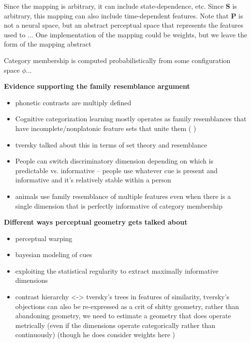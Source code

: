 \begin{multicols}{2}

Since the mapping is arbitrary, it can include state-dependence, etc. Since $\mathbf{S}$ is arbitrary, this mapping can also include time-dependent features. Note that $\mathbf{P}$ is not a neural space, but an abstract perceptual space that represents the features used to ... One implementation of the mapping could be weights, but we leave the form of the mapping abstract

Category membership is computed probabilistically from some configuration space $\phi$...








\textbf{Evidence supporting the family resemblance argument}
\begin{itemize}
	\item phonetic contrasts are multiply defined\cite{Lisker1977,Bailey1980}
	\item Cognitive categorization learning mostly operates as family resemblances that have incomplete/nonplatonic feature sets that unite them (\cite{roschFamilyResemblancesStudies1975}\cite{roschWittgensteinCategorizationResearch1987} \cite{couchmanRulesResemblanceTheir2010})
	\item tversky talked about this in terms of set theory and resemblance \cite{tverskyStudiesSimilarity1978} \cite{Tversky1970}
	\item People can switch discriminatory dimension depending on which is predictable vs. informative -- people use whatever cue is present and informative \cite{kiefteAbsorptionReliableSpectral2008} and it's relatively stable within a person \cite{souzaReliabilityRepeatabilitySpeech2018}
	\item animals use family resemblance of multiple features even when there is a single dimension that is perfectly informative of category membership \cite{leaUseMultipleDimensions2008, couchmanRulesResemblanceTheir2010}

\end{itemize}

\textbf{Different ways perceptual geometry gets talked about}
\begin{itemize}
	\item perceptual warping
	\item bayesian modeling of cues
	\item exploiting the statistical regularity to extract maximally informative dimensions
	\item contrast hierarchy <-> tversky's trees in features of similarity, tversky's objections can also be re-expressed as a crit of shitty geometry, rather than abandoning geometry, we need to estimate a geometry that does operate metrically (even if the dimensions operate categorically rather than continuously) (though he does consider weights here \cite{ritovDifferentialWeightingCommon1990})
\end{itemize}


\end{multicols}
